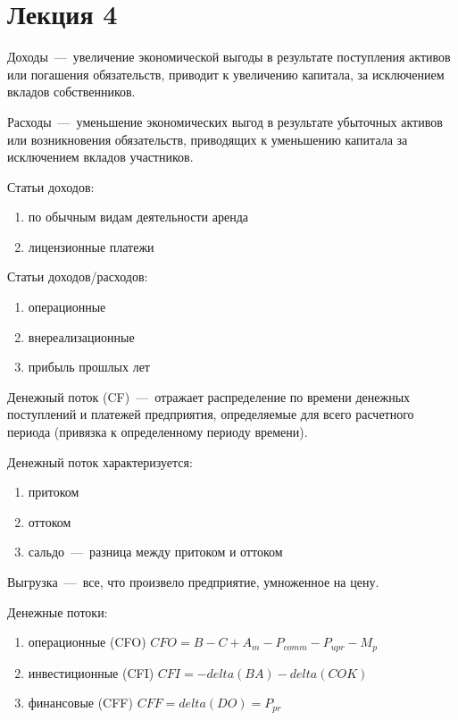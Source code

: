 \documentclass[14pt]{extarticle}
\begin{document}
\section{Лекция 4}

Доходы~---~увеличение экономической выгоды в результате поступления активов или погашения обязательств, приводит к увеличению капитала, за исключением вкладов собственников.

Расходы~---~уменьшение экономических выгод в результате убыточных активов или возникновения обязательств, приводящих к уменьшению капитала за исключением вкладов участников.

Статьи доходов:

\begin{enumerate}
	\item по обычным видам деятельности аренда
	\item лицензионные платежи
\end{enumerate}

Статьи доходов/расходов:

\begin{enumerate}
	\item операционные
	\item внереализационные
	\item прибыль прошлых лет
\end{enumerate}

Денежный поток (CF)~---~отражает распределение по времени денежных поступлений и платежей предприятия, определяемые для всего расчетного периода (привязка к определенному периоду времени).

Денежный поток характеризуется:

\begin{enumerate}
	\item притоком
	\item оттоком
	\item сальдо~---~разница между притоком и оттоком
\end{enumerate}


Выгрузка~---~все, что произвело предприятие, умноженное на цену.

Денежные потоки:

\begin{enumerate}
	\item операционные (CFO) $CFO = B - C + A_{m} - P_{comm} - P_{upr} - M_{p}$
	\item инвестиционные (CFI) $CFI = -delta(BA) - delta(COK)$
	\item финансовые (CFF) $CFF = delta(DO) = P_{pr}$
\end{enumerate}
\end{document}
